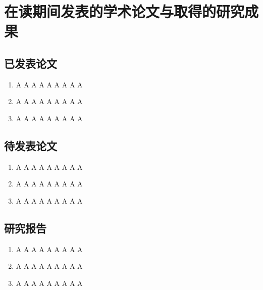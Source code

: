﻿\chapter{在读期间发表的学术论文与取得的研究成果}

\section*{已发表论文}

\begin{enumerate}
\item A A A A A A A A A
\item A A A A A A A A A
\item A A A A A A A A A
\end{enumerate}

\section*{待发表论文}

\begin{enumerate}
\item A A A A A A A A A
\item A A A A A A A A A
\item A A A A A A A A A
\end{enumerate}

\section*{研究报告}
\begin{enumerate}
\item A A A A A A A A A
\item A A A A A A A A A
\item A A A A A A A A A
\end{enumerate}
